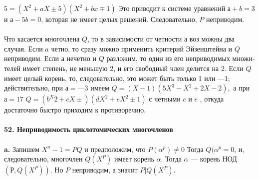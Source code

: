 \documentclass{mai_book}
\begin{document}
$5 = (X^{2} + aX \pm 5)(X^{2} + bx \mp 1)$ Это приводит к системе уравнений \linebreak
$а + b = 3$ и $а - 5b = 0$, которая не имеет целых решений. Следовательно,\linebreak
$P$ неприводим.\\
\\
\hspace*{15pt}Что касается многочлена $Q$, то в зависимости от четности а воз­
можны два случая. Если $a$ четно, то сразу можно применить критерий
Эйзенштейна и $Q$ неприводим.
\hspace*{0pt} Если а нечетно и $Q$ разложим, то один из его неприводимых множи­\linebreak
телей имеет степень, не меньшую 2, и его свободный член делится на 2.\linebreak
Если $Q$ имеет целый корень, то, следовательно, это может быть только 1\linebreak
или —1; действительно, при $а = —3$ имеем $Q = (X - 1)(5X^3 - X^2 + 2X - 2),$\linebreak
а при $а = 17$ $Q = (b^X{2} + cX \pm)(dX^{2} + eX^{2} \pm 1)$ с четными $c$ и $e$ , откуда\linebreak
достаточно быстро приходим к противоречию.\\
\\
\noindent\textbf{52. Неприводимость циклотомических многочленов}\\
\\
\hspace*{15pt}\textbf{a.} Запишем $X^{n} - 1 = PQ $ и предположим, что $P(\alpha^p) \neq 0$ Тогда\linebreak
$Q(\alpha^{p} = 0$, и, следовательно, многочлен $Q(X^{P})$ имеет корень $\alpha$. Тогда\linebreak
$\alpha$ ---  корень НОД$(Р, Q(X^{P}))$. Но $P$ неприводим, а значит $P | Q(X^{P})$.\\
\end{document}
